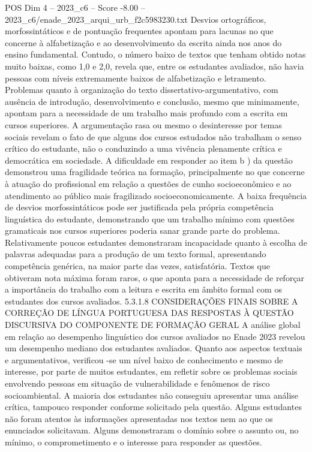 \begin{textsample}{POS Dim 4 – 2023\_c6 – Score -8.00 – 2023\_c6/enade\_2023\_arqui\_urb\_f2c5983230.txt}
Desvios ortográficos, morfossintáticos e de pontuação frequentes apontam para lacunas no que concerne à alfabetização e ao desenvolvimento da escrita ainda nos anos do ensino fundamental.
Contudo, o número baixo de textos que tenham obtido notas muito baixas, como 1,0 e 2,0, revela que, entre os estudantes avaliados, não havia pessoas com níveis extremamente baixos de alfabetização e letramento.
Problemas quanto à organização do texto dissertativo-argumentativo, com ausência de introdução, desenvolvimento e conclusão, mesmo que minimamente, apontam para a necessidade de um trabalho mais profundo com a escrita em cursos superiores.
A argumentação rasa ou mesmo o desinteresse por temas sociais revelam o fato de que alguns dos cursos estudados não trabalham o senso crítico do estudante, não o conduzindo a uma vivência plenamente crítica e democrática em sociedade.
A dificuldade em responder ao item b ) da questão demonstrou uma fragilidade teórica na formação, principalmente no que concerne à atuação do profissional em relação a questões de cunho socioeconômico e ao atendimento ao público mais fragilizado socioeconomicamente.
A baixa frequência de desvios morfossintáticos pode ser justificada pela própria competência linguística do estudante, demonstrando que um trabalho mínimo com questões gramaticais nos cursos superiores poderia sanar grande parte do problema.
Relativamente poucos estudantes demonstraram incapacidade quanto à escolha de palavras adequadas para a produção de um texto formal, apresentando competência genérica, na maior parte das vezes, satisfatória.
Textos que obtiveram nota máxima foram raros, o que aponta para a necessidade de reforçar a importância do trabalho com a leitura e escrita em âmbito formal com os estudantes dos cursos avaliados. 5.3.1.8 CONSIDERAÇÕES FINAIS SOBRE A CORREÇÃO DE LÍNGUA PORTUGUESA DAS RESPOSTAS À QUESTÃO DISCURSIVA DO COMPONENTE DE FORMAÇÃO GERAL A análise global em relação ao desempenho linguístico dos cursos avaliados no Enade 2023 revelou um desempenho mediano dos estudantes avaliados.
Quanto aos aspectos textuais e argumentativos, verificou -se um nível baixo de conhecimento e mesmo de interesse, por parte de muitos estudantes, em refletir sobre os problemas sociais envolvendo pessoas em situação de vulnerabilidade e fenômenos de risco socioambiental.
A maioria dos estudantes não conseguiu apresentar uma análise crítica, tampouco responder conforme solicitado pela questão.
Alguns estudantes não foram atentos às informações apresentadas nos textos nem ao que os enunciados solicitavam.
Alguns demonstraram o domínio sobre o assunto ou, no mínimo, o comprometimento e o interesse para responder as questões.

\end{textsample}
